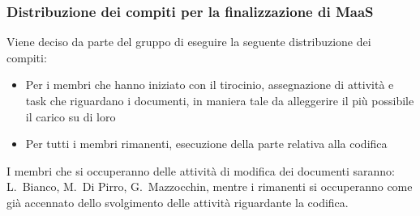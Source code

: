 \documentclass[11pt]{meetingmins}
\begin{document}
\subsubsection{Distribuzione dei compiti per la finalizzazione di MaaS}

Viene deciso da parte del gruppo di eseguire la seguente distribuzione dei compiti:
\begin{itemize}

\item Per i membri che hanno iniziato con il tirocinio, assegnazione di attività e task che riguardano i documenti, in maniera tale da alleggerire il più possibile il carico su di loro
\item Per tutti i membri rimanenti, esecuzione della parte relativa alla codifica
\end{itemize}

I membri che si occuperanno delle attività di modifica dei documenti saranno: L.~Bianco, M.~Di Pirro, G.~Mazzocchin, mentre i rimanenti si occuperanno come già accennato dello svolgimento delle attività riguardante la codifica.


\end{document}
